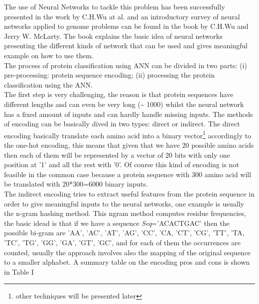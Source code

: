 \documentclass[a4paper, 10pt, conference]{ieeeconf}      %
\begin{document}
The use of Neural Networks to tackle this problem has been successfully presented in the work by C.H.Wu at al.\cite{wu1992}\cite{wu1995}\cite{wu1996} and an introductory survey of neural networks applied to genome problems can be found in the book by C.H.Wu and Jerry W. McLarty\cite{bookWu}. The book explains the basic idea of neural networks presenting the different kinds of network that can be used and gives meaningful example on how to use them.\\
The process of protein classification using ANN can be
divided in two parts: (i) pre-processing: protein sequence
encoding; (ii) processing the protein classification using the
ANN.\\ The first step is very challenging, the reason is that protein sequences have different lengths and can even be very long (\textasciitilde
1000) whilst the neural network has a fixed amount of inputs and can hardly handle missing inputs. The methods of encoding can be basically dived in two types\cite{bookWu}: direct or indirect. The direct encoding basically translate each amino acid into a binary vector\footnote{other techniques will be presented later} accordingly to the one-hot encoding, this means that given that we have 20 possible amino acids then each of them will be represented by a vector of 20 bits with only one position at '1' and all the rest with '0'. Of course this kind of encoding is not feasible in the common case because a protein sequence with 300 amino acid will be translated with 20*300=6000 binary inputs.\\
The indirect encoding tries to extract useful features from the protein sequence in order to give meaningful inputs to the neural networks, one example is usually the n-gram hashing method\cite{wu1992}. This ngram method computes residue frequencies, the basic idead is that if we have a sequence \textit{Seq}='ACACTGAC' then the possible bi-gram are 'AA', 'AC', 'AT', 'AG', 'CC', 'CA, 'CT', 'CG', 'TT', 'TA, 'TC', 'TG', 'GG', 'GA', 'GT', 'GC', and for each of them the occurrences are counted, usually the approach involves also the mapping of the original sequence to a smaller alphabet. A summary table on the encoding pros and cons is shown in Table I\\
\end{document}
